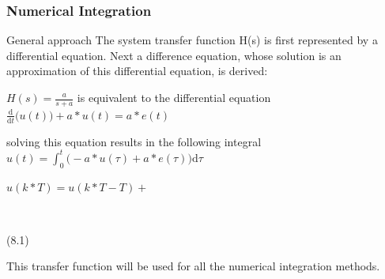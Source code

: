 \begin{frame}
	\frametitle{Numerical Integration}
	\begin{block}{General approach}
		The system transfer function H(s) is first represented by a differential equation. Next a difference equation, whose solution is an approximation of this differential equation, is derived: 
		\begin{center}
			$H(s) = \frac{a}{s + a}$
			is equivalent to the differential equation
			$\frac{\mathrm d}{\mathrm d t} \big( u(t) \big) + a*u(t) = a*e(t)$
			
			solving this equation results in the following integral
			$u(t) = \int_0^t \big(-a*u(\tau) + a*e(\tau) \big)\mathrm{d}\tau$
			
			$u(k*T) = u(k*T - T)+ $ \begin{cases}
				\\
			\end{cases}
			(8.1)
		\end{center}
		This transfer function will be used for all the numerical integration methods.
	\end{block}
\end{frame}

